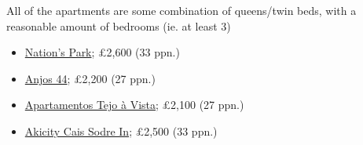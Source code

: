 \documentclass[12pt]{article}
\newcommand{\cost}[2]{\pounds#1 (#2 ppn.)}
\begin{document}
	All of the apartments are some combination of queens/twin beds, with a reasonable amount of bedrooms (ie. at least 3)
	\begin{itemize}
		\item 
		\href{https://www.booking.com/hotel/pt/mahouse-guest-house-lisboa.html?aid=355028;sid=3f62ec944d118827daff72c411262409;all_sr_blocks=718746801_305311707_16_2_0;checkin=2022-05-28;checkout=2022-06-05;dest_id=-2167973;dest_type=city;dist=0;group_adults=10;group_children=0;hapos=4;highlighted_blocks=718746801_305311707_16_2_0;hpos=4;map=1;matching_block_id=718746801_305311707_16_2_0;no_rooms=1;req_adults=10;req_children=0;room1=A%2CA%2CA%2CA%2CA%2CA%2CA%2CA%2CA%2CA;sb_price_type=total;sr_order=popularity;sr_pri_blocks=718746801_305311707_16_2_0__317000;srepoch=1648314704;srpvid=b13d78e7745e0106;type=total;ucfs=1&#map_closed}{Nation's Park}; \cost{2,600}{33}
		\item 
		\href{https://www.booking.com/hotel/pt/anjos-44-lisbon-apartments.html?aid=355028;sid=3f62ec944d118827daff72c411262409;all_sr_blocks=251194703_310973254_6_0_0%2C251194705_310973254_4_0_0;checkin=2022-05-28;checkout=2022-06-05;dest_id=-2167973;dest_type=city;dist=0;group_adults=10;group_children=0;hapos=5;highlighted_blocks=251194703_310973254_6_0_0%2C251194705_310973254_4_0_0;hpos=5;matching_block_id=251194703_310973254_6_0_0;no_rooms=1;req_adults=10;req_children=0;room1=A%2CA%2CA%2CA%2CA%2CA%2CA%2CA%2CA%2CA;sb_price_type=total;sr_order=popularity;sr_pri_blocks=251194703_310973254_6_0_0__136450%2C251194705_310973254_4_0_0__134200;srepoch=1648314704;srpvid=b13d78e7745e0106;type=total;ucfs=1&#hotelTmpl}{Anjos 44}; \cost{2,200}{27}
		\item 
		\href{https://www.booking.com/hotel/pt/duplex-tejo-a-vista-43680-47-al.html?aid=355028;sid=3f62ec944d118827daff72c411262409;all_sr_blocks=243100502_143345713_4_0_0%2C243100501_143345713_6_0_0;checkin=2022-05-28;checkout=2022-06-05;dest_id=-2167973;dest_type=city;dist=0;group_adults=10;group_children=0;hapos=6;highlighted_blocks=243100502_143345713_4_0_0%2C243100501_143345713_6_0_0;hpos=6;matching_block_id=243100502_143345713_4_0_0;no_rooms=1;req_adults=10;req_children=0;room1=A%2CA%2CA%2CA%2CA%2CA%2CA%2CA%2CA%2CA;sb_price_type=total;sr_order=popularity;sr_pri_blocks=243100502_143345713_4_0_0__101600%2C243100501_143345713_6_0_0__152400;srepoch=1648314704;srpvid=b13d78e7745e0106;type=total;ucfs=1&#hotelTmpl}{Apartamentos Tejo \`{a} Vista}; \cost{2,100}{27}
		\item 
		\href{https://www.booking.com/hotel/pt/akicity-cais-sodre-in.html?aid=355028;sid=3f62ec944d118827daff72c411262409;all_sr_blocks=271036203_310657547_5_0_0%2C271036201_310657547_5_0_0;checkin=2022-05-28;checkout=2022-06-05;dest_id=-2167973;dest_type=city;dist=0;group_adults=10;group_children=0;hapos=7;highlighted_blocks=271036203_310657547_5_0_0%2C271036201_310657547_5_0_0;hpos=7;matching_block_id=271036203_310657547_5_0_0;no_rooms=1;req_adults=10;req_children=0;room1=A%2CA%2CA%2CA%2CA%2CA%2CA%2CA%2CA%2CA;sb_price_type=total;sr_order=popularity;sr_pri_blocks=271036203_310657547_5_0_0__153800%2C271036201_310657547_5_0_0__153800;srepoch=1648314704;srpvid=b13d78e7745e0106;type=total;ucfs=1&#hotelTmpl}{Akicity Cais Sodre In}; \cost{2,500}{33}

\end{itemize}
\end{document}
